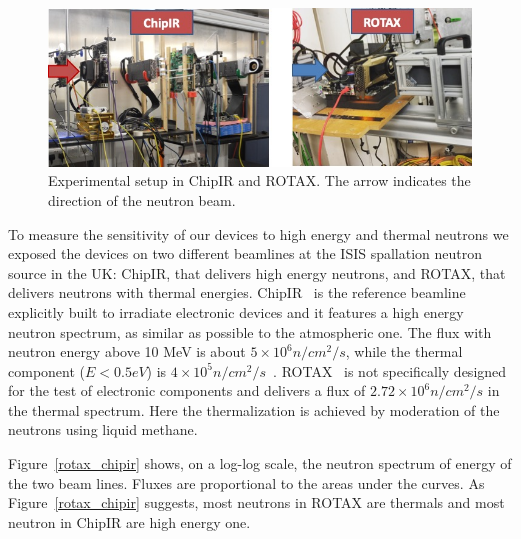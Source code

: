 \label{sub_beam_setup}

\begin{figure}[tb]
\centering
\includegraphics[width=0.80\columnwidth]{./figs/setup}
\caption{Experimental setup in ChipIR and ROTAX. The arrow indicates the direction of the neutron beam.}
\label{rad_setup}
\end{figure}

To measure the sensitivity of our devices to high energy and thermal neutrons we exposed the devices on two different beamlines at the ISIS spallation neutron source in the UK: ChipIR, that delivers high energy neutrons, and ROTAX, that delivers neutrons with thermal energies.
ChipIR~\cite{cazzaniga2018progress} is the reference beamline explicitly built to irradiate electronic devices and it features a high energy neutron spectrum, as similar as possible to the atmospheric one. The flux with neutron energy above 10 MeV is about $5 \times {10}^6 n/{cm}^2/s$, while the thermal component ($E < 0.5 eV$) is $4 \times {10}^5 n/{cm}^2/s$~\cite{chiesa2018measurement}.
ROTAX~\cite{tietze1989rotax} is not specifically designed for the test of electronic components and delivers a flux of $2.72\times{10}^6 n/{cm}^2/s$ in the thermal spectrum. Here the thermalization is achieved by moderation of the neutrons using liquid methane. 

Figure~\ref{rotax_chipir} shows, on a log-log scale, the neutron spectrum of energy of the two beam lines. Fluxes are proportional to the areas under the curves. As Figure~\ref{rotax_chipir} suggests, most neutrons in ROTAX are thermals and most neutron in ChipIR are high energy one. 

